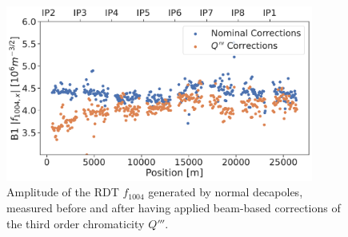 \begin{figure}[H]
    \centering
    \includegraphics[width=0.9\textwidth]{./images/f1004_dq3.pdf}
    \caption{Amplitude of the RDT $f_{1004}$ generated by normal decapoles, measured before and
    after having applied beam-based corrections of the third order chromaticity $Q'''$.}
    \label{fig:decapoles:rdts:f1004_dq3}
\end{figure}



\subsection{}


\subsection{}


